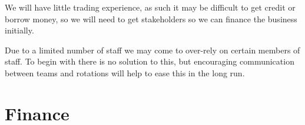 \documentclass[DIV=calc, paper=a4, fontsize=11pt]{scrartcl}	 %
\begin{document}
We will have little trading experience, as such it may be difficult to get credit or borrow money,
so we will need to get stakeholders so we can finance the business initially.

Due to a limited number of staff we may come to over-rely on certain members of staff. To begin
with there is no solution to this, but encouraging communication between teams and rotations will
help to ease this in the long run.

\section{Finance}
\end{document}
